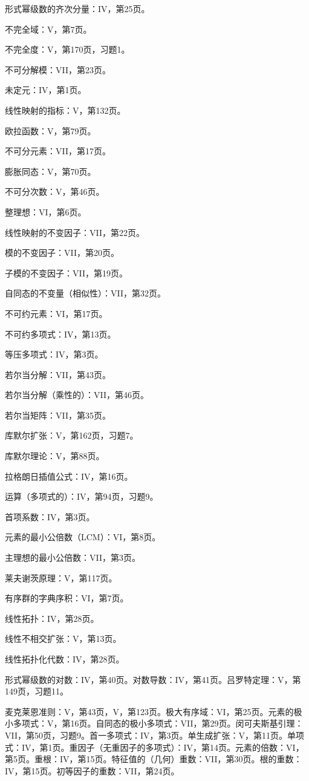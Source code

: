形式幂级数的齐次分量：IV，第25页。

不完全域：V，第7页。

不完全度：V，第170页，习题1。

不可分解模：VII，第23页。

未定元：IV，第1页。

线性映射的指标：V，第132页。

欧拉函数：V，第79页。

不可分元素：VII，第17页。

膨胀同态：V，第70页。

不可分次数：V，第46页。

整理想：VI，第6页。

线性映射的不变因子：VII，第22页。

模的不变因子：VII，第20页。

子模的不变因子：VII，第19页。

自同态的不变量（相似性）：VII，第32页。

不可约元素：VI，第17页。

不可约多项式：IV，第13页。

等压多项式：IV，第3页。

若尔当分解：VII，第43页。

若尔当分解（乘性的）：VII，第46页。

若尔当矩阵：VII，第35页。

库默尔扩张：V，第162页，习题7。

库默尔理论：V，第88页。

拉格朗日插值公式：IV，第16页。

运算（多项式的）：IV，第94页，习题9。

首项系数：IV，第3页。

元素的最小公倍数（LCM）：VI，第8页。

主理想的最小公倍数：VII，第3页。

莱夫谢茨原理：V，第117页。

有序群的字典序积：VI，第7页。

线性拓扑：IV，第28页。

线性不相交扩张：V，第13页。

线性拓扑化代数：IV，第28页。

形式幂级数的对数：IV，第40页。对数导数：IV，第41页。吕罗特定理：V，第149页，习题11。

麦克莱恩准则：V，第43页，V，第123页。极大有序域：VI，第25页。元素的极小多项式：V，第16页。自同态的极小多项式：VII，第29页。闵可夫斯基引理：VII，第50页，习题9。首一多项式：IV，第3页。单生成扩张：V，第11页。单项式：IV，第1页。重因子（无重因子的多项式）：IV，第14页。元素的倍数：VI，第5页。重根：IV，第15页。特征值的（几何）重数：VII，第30页。根的重数：IV，第15页。初等因子的重数：VII，第24页。

